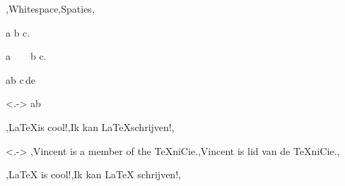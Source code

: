 \begin{frame}{\lang,Whitespace,Spaties,}

    \begin{noindentlist}
        \item<+-> 
        a    b c.
        
        \item<+-> \leavevmode{}
        a\ \ \ \ b c.

        \item<+-> 
        a\quad b c\,d\;e

        \item<.-> 
        a\hspace{2cm}b
        
        \item<+-> 
        \lang,\LaTeX is cool!,Ik kan \LaTeX schrijven!,

        \item<.-> \leavevmode{}
        \lang,{\scriptsize Vincent is a member of the \TeX niCie.},Vincent is lid van de \TeX niCie.,

        \item<+-> 
        \lang,\LaTeX{} is cool!,Ik kan \LaTeX{} schrijven!,


\end{noindentlist}
\end{frame}
